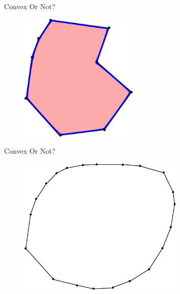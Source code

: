 \documentclass{beamer}
\begin{document}
\begin{frame}{Convex Or Not?}

\begin{figure}[t]
	\centering
	\includegraphics[width=0.5\textwidth]{ConvexNonconvex2.pdf}
\end{figure}

\end{frame}

\begin{frame}{Convex Or Not?}

\begin{figure}[t]
	\centering
	\includegraphics[width=0.7\textwidth]{ConvexNonconvex3.pdf}
\end{figure}

\end{frame}

\end{document}
